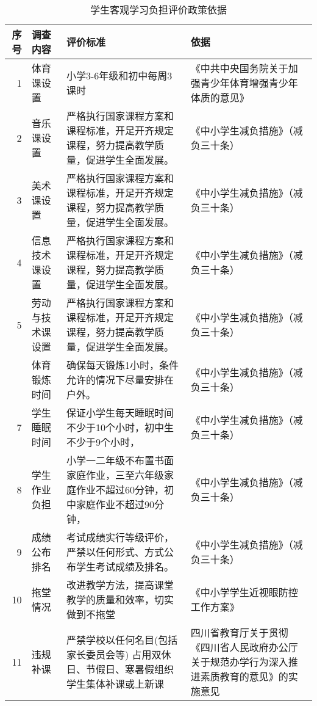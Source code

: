 \documentclass[cn, 11pt, fancy, hide]{elegantbook}
\begin{document}
\begin{table}[!h]

\caption{\label{tab:zcyj}学生客观学习负担评价政策依据}
\centering
\begin{tabular}{r>{\raggedright\arraybackslash}p{2cm}>{\raggedright\arraybackslash}p{5cm}>{\raggedright\arraybackslash}p{6cm}}
\toprule
序号 & 调查内容 & 评价标准 & 依据\\
\midrule
\rowcolor{gray!6}  1 & 体育课设置 & 小学3-6年级和初中每周3课时 & 《中共中央国务院关于加强青少年体育增强青少年体质的意见》\\
2 & 音乐课设置 & 严格执行国家课程方案和课程标准，开足开齐规定课程，努力提高教学质量，促进学生全面发展。 & 《中小学生减负措施》（减负三十条）\\
\rowcolor{gray!6}  3 & 美术课设置 & 严格执行国家课程方案和课程标准，开足开齐规定课程，努力提高教学质量，促进学生全面发展。 & 《中小学生减负措施》（减负三十条）\\
4 & 信息技术课设置 & 严格执行国家课程方案和课程标准，开足开齐规定课程，努力提高教学质量，促进学生全面发展。 & 《中小学生减负措施》（减负三十条）\\
\rowcolor{gray!6}  5 & 劳动与技术课设置 & 严格执行国家课程方案和课程标准，开足开齐规定课程，努力提高教学质量，促进学生全面发展。 & 《中小学生减负措施》（减负三十条）\\
\addlinespace
6 & 体育锻炼时间 & 确保每天锻炼1小时，条件允许的情况下尽量安排在户外。 & 《中小学生减负措施》（减负三十条）\\
\rowcolor{gray!6}  7 & 学生睡眠时间 & 保证小学生每天睡眠时间不少于10个小时，初中生不少于9个小时， & 《中小学生减负措施》（减负三十条）\\
8 & 学生作业负担 & 小学一二年级不布置书面家庭作业，三至六年级家庭作业不超过60分钟，初中家庭作业不超过90分钟， & 《中小学生减负措施》（减负三十条）\\
\rowcolor{gray!6}  9 & 成绩公布排名 & 考试成绩实行等级评价，严禁以任何形式、方式公布学生考试成绩及排名。 & 《中小学生减负措施》（减负三十条）\\
10 & 拖堂情况 & 改进教学方法，提高课堂教学的质量和效率，切实做到不拖堂 & 《中小学学生近视眼防控工作方案》\\
\addlinespace
\rowcolor{gray!6}  11 & 违规补课 & 严禁学校以任何名目(包括家长委员会等) 占用双休日、节假日、寒暑假组织学生集体补课或上新课 & 四川省教育厅关于贯彻《四川省人民政府办公厅关于规范办学行为深入推进素质教育的意见》的实施意见\\
\bottomrule
\end{tabular}
\end{table}
\end{document}
